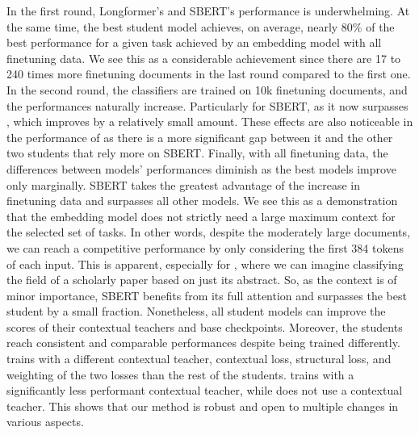 In the first round, Longformer's and SBERT's performance is underwhelming. At the same time, the best student model achieves, on average, nearly 80\% of the best
performance for a given task achieved by an embedding model with all finetuning
data. We see this as a considerable achievement since there are 17 to 240 times more
finetuning documents in the last round compared to the first one. In the second
round, the classifiers are trained on 10k finetuning documents, and the
performances naturally increase. Particularly for SBERT, as it now surpasses
, which improves by a relatively small amount. These effects are also
noticeable in the performance of {\CosineStudent} as there is a more significant gap
between it and the other two students that rely more on SBERT. Finally, with all
finetuning data, the differences between models' performances diminish as the
best models improve only marginally. SBERT takes the greatest advantage of the
increase in finetuning data and surpasses all other models. We see this as a
demonstration that the embedding model does not strictly
need a large maximum context for the selected set of tasks. In other words, despite the moderately large
documents, we can reach a competitive performance by only
considering the first 384 tokens of each input. This is apparent, especially for
, where we can imagine classifying the field of a scholarly paper
based on just its abstract. So, as the context is of minor importance, SBERT
benefits from its full attention and surpasses the best student by a small
fraction. Nonetheless, all student models can improve the scores of their
contextual teachers and base checkpoints. Moreover, the students reach
consistent and comparable performances despite being trained differently.
{\CosineStudent} trains with a different contextual teacher, contextual loss,
structural loss, and weighting of the two losses than the rest of the students.
{\MSEStudent} trains with a significantly less performant contextual teacher,
while {\OnlyMSEStudent} does not use a contextual teacher. This shows that
our method is robust and open to multiple changes in various aspects.


